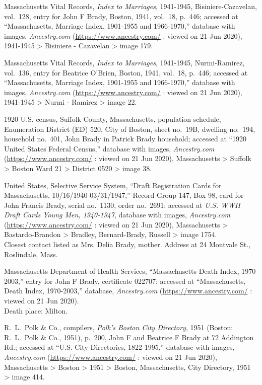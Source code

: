 \begin{thebibliography}{999}
	Massachusetts Vital Records, \textit{Index to Marriages}, 1941-1945, Bisiniere-Cazavelan, vol.\ 128, entry for John F Brady, Boston, 1941, vol.\ 18, p.\ 446; accessed at ``Massachusetts, Marriage Index, 1901-1955 and 1966-1970,'' database with images, \textit{Ancestry.com} (\url{https://www.ancestry.com/} : viewed on 21 Jun 2020), 1941-1945 > Bisiniere - Cazavelan > image 179.
	
	Massachusetts Vital Records, \textit{Index to Marriages}, 1941-1945, Nurmi-Ramirez, vol.\ 136, entry for Beatrice O'Brien, Boston, 1941, vol.\ 18, p.\ 446; accessed at ``Massachusetts, Marriage Index, 1901-1955 and 1966-1970,'' database with images, \textit{Ancestry.com} (\url{https://www.ancestry.com/} : viewed on 21 Jun 2020), 1941-1945 > Nurmi - Ramirez > image 22.
	
	1920 U.S. census, Suffolk County, Massachusetts, population schedule, Enumeration District (ED) 520, City of Boston, sheet no.\ 19B, dwelling no.\ 194, household no.\ 401, John Brady in Patrick Brady household; accessed at ``1920 United States Federal Census,'' database with images, \textit{Ancestry.com} (\url{https://www.ancestry.com/} : viewed on 21 Jun 2020), Massachusetts > Suffolk > Boston Ward 21 > District 0520 > image 38.
	
	United States, Selective Service System, ``Draft Registration Cards for Massachusetts, 10/16/1940-03/31/1947,'' Record Group 147, Box 98, card for John Francis Brady, serial no.\ 1130, order no.\ 2691; accessed at \textit{U.S. WWII Draft Cards Young Men, 1940-1947}, database with images, \textit{Ancestry.com} (\url{https://www.ancestry.com/} : viewed on 21 Jun 2020), Massachusetts >  Bastardo-Brandon > Bradley, Bernard-Brady, Russell > image 1754.\\
	Closest contact listed as Mrs. Delia Brady, mother. Address at 24 Montvale St., Roslindale, Mass.
	
	Massachusetts Department of Health Services, ``Massachusetts Death Index, 1970-2003,'' entry for John F Brady, certificate 022707; accessed at ``Massachusetts, Death Index, 1970-2003,'' database, \textit{Ancestry.com} (\url{https://www.ancestry.com/} : viewed on 21 Jun 2020).\\
	Death place: Milton.
	
	R.\ L.\ Polk \& Co., compilers, \textit{Polk's Boston City Directory}, 1951 (Boston: R.\ L.\ Polk \& Co., 1951), p.\ 200, John F and Beatrice F Brady at 72 Addington Rd.; accessed at ``U.S. City Directories, 1822-1995,'' database with images, \textit{Ancestry.com} (\url{https://www.ancestry.com/} : viewed on 21 Jun 2020), Massachusetts > Boston > 1951 > Boston, Massachusetts, City Directory, 1951 > image 414.
	

\end{thebibliography}
